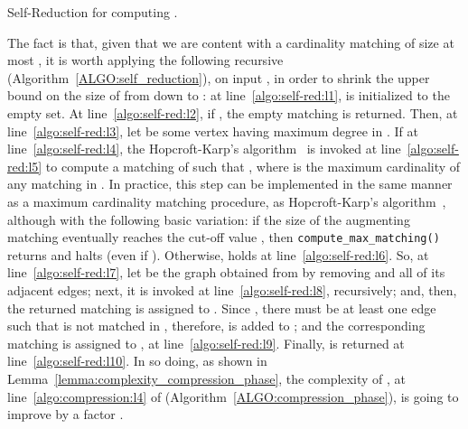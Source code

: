 \begin{algorithm}[t]
\caption{Self-Reduction for computing .}\label{ALGO:self_reduction}
\nonl{}
\DontPrintSemicolon
\footnotesize
{}
\end{algorithm}

The fact is that, given that we are content with a cardinality matching of size at most ,
it is worth applying the following recursive  (Algorithm~\ref{ALGO:self_reduction}),
on input , in order to shrink the upper bound on the size of  from  down to :
at line~\ref{algo:self-red:l1},  is initialized to the empty set. At line~\ref{algo:self-red:l2}, if , the empty matching  is returned.
Then, at line~\ref{algo:self-red:l3}, let  be some vertex having maximum degree  in .
If  at line~\ref{algo:self-red:l4}, the Hopcroft-Karp's algorithm~\cite{HK73} is invoked at line~\ref{algo:self-red:l5}
to compute a matching  of  such that , where  is the maximum cardinality of any matching in .
In practice, this step can be implemented in the same manner as a maximum cardinality matching procedure,
\eg as Hopcroft-Karp's algorithm~\cite{HK73}, although with the following basic variation:
if the size of the augmenting matching  eventually reaches the cut-off value ,
then \texttt{compute\_max\_matching()}
returns  and halts (\ie even if ).
Otherwise,  holds at line~\ref{algo:self-red:l6}. So, at line~\ref{algo:self-red:l7},
let  be the graph obtained from  by removing  and all of its adjacent edges;
next, it is invoked  at line~\ref{algo:self-red:l8}, recursively; and, then, the returned matching is assigned to .
Since , there must be at least one edge  such that  is not matched in ,
therefore,  is added to ; and the corresponding matching is assigned to , at line~\ref{algo:self-red:l9}.
Finally,  is returned at line~\ref{algo:self-red:l10}. In so doing, as shown in Lemma~\ref{lemma:complexity_compression_phase},
the complexity of , at line~\ref{algo:compression:l4} of  (Algorithm~\ref{ALGO:compression_phase}),
is going to improve by a factor .


